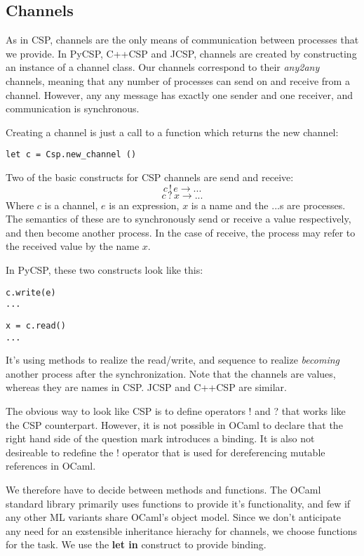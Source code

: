 \documentclass[a4paper,12pt]{article}
\begin{document}
\subsection{Channels}

As in CSP, channels are the only means of communication between processes that we provide.
In PyCSP, C++CSP and JCSP, channels are created by constructing an instance of a channel
class. Our channels correspond to their \emph{any2any} channels, meaning that any number
of processes can send on and receive from a channel. However, any any message has exactly 
one sender and one receiver, and communication is synchronous.

Creating a channel is just a call to a function which returns the new channel:
\begin{verbatim}
let c = Csp.new_channel ()
\end{verbatim}

Two of the basic constructs for CSP channels are send and receive:
\[c\,!\,e \to ...\]
\[c\,?\,x \to ...\]
Where $c$ is a channel, $e$ is an expression, $x$ is a name and the $...$s are processes. 
The semantics of these are to synchronously send or receive a value respectively, and
then become another process. In the case of receive, the process may refer to the
received value by the name $x$.

In PyCSP, these two constructs look like this:
\begin{verbatim}
c.write(e)
...
\end{verbatim}
\begin{verbatim}
x = c.read()
...
\end{verbatim}
It's using methods to realize the read/write, and sequence to realize \emph{becoming}
another process after the synchronization. Note that the channels are values, whereas
they are names in CSP. JCSP and C++CSP are similar.

The obvious way to look like CSP is to define operators ! and ? that works like the
CSP counterpart. However, it is not possible in OCaml to declare that the right hand 
side of the question mark introduces a binding. It is also not desireable to redefine
the ! operator that is used for dereferencing mutable references in OCaml.

We therefore have to decide between methods and functions. The OCaml standard library
primarily uses functions to provide it's functionality, and few if any other ML 
variants share OCaml's object model. Since we don't anticipate any need for an
exstensible inheritance hierachy for channels, we choose functions for the task.
We use the \textbf{let in} construct to provide binding.
\end{document}
